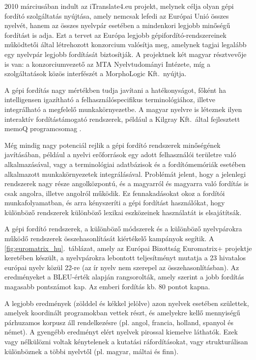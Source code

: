 \begin{multicols}{2}
  2010 márciusában indult az iTranslate4.eu \cite{it4eu} projekt, melynek célja olyan gépi fordító szolgáltatás nyújtása, amely nemcsak lefedi az Európai Unió összes nyelvét, hanem az összes nyelvpár esetében a mindenkori legjobb minőségű fordítást is adja. Ezt a tervet az Európa legjobb gépifordító-rendszereinek működtetői által létrehozott konzorcium valósítja meg, amelynek tagjai legalább egy nyelvpár legjobb fordítását biztosítják. A projektnek két magyar résztvevője is van: a konzorciumvezető az MTA Nyelvtudományi Intézete, míg a szolgáltatások közös interfészét a MorphoLogic Kft.\ nyújtja. 

  A gépi fordítás nagy mértékben tudja javítani a hatékonyságot, főként ha intelligensen igazítható a felhasználóspecifikus terminológiához, illetve integrálható a megfelelő munkakörnyezetbe. A ma\-gyar nyelvre is léteznek ilyen interaktív fordítástámogató rendszerek, például a Kilgray Kft.\ által fejlesztett memoQ prog\-ram\-cso\-mag \cite{memoq}. 

  Még mindig nagy potenciál rejlik a gépi fordító rendszerek minőségének ja\-ví\-tá\-sá\-ban, például a nyelvi erőforrások egy adott felhasználói területre való alkalmazásával, vagy a terminológiai adatbázisok és a fordítómemóriák esetében alkalmazott munkakörnyezetek integrálásával. Problémát jelent, hogy a jelenlegi rendszerek nagy része angolközpontú, és a magyarról és magyarra való fordítás is csak angolra, illetve angolról működik. Ez fennakadásokat okoz a fordítói munkafolyamatban, és arra kényszeríti a gépi fordítást használókat, hogy különböző rendszerek különböző lexikai eszközeinek használatát is elsajátítsák.

  A gépi fordító rendszerek, a különböző módszerek és a különböző nyelvpárokra működő rendszerek összehasonlítását ki\-ér\-té\-ke\-lő kampányok segítik. A \ref{fig:euromatrix_hu}.~táblázat, amely az Európai Bizottság Euromatrix+ projektje keretében készült, a nyelvpárokra lebontott teljesítményt mutatja a 23 hivatalos európai nyelv közül 22-re (az ír nyelv nem szerepel az összehasonlításban). Az eredményeket a BLEU-érték \cite{bleu1} alapján rangsorolták, amely szerint a jobb fordítás magasabb pontszámot kap. Az emberi fordítás kb. 80 pontot kapna.

  A legjobb eredmények (zölddel és kékkel jelölve) azon nyelvek esetében születtek, amelyek koordinált programokban vettek részt, és amelyekre kellő mennyiségű párhuzamos korpusz áll rendelkezésre (pl. angol, francia, holland, spanyol és német). A gyengébb eredményt elért nyelvek pi\-ros\-sal kiemelve láthatók. Ezek vagy nélkülözni voltak kénytelenek a kutatási ráfordításokat, vagy strukturálisan különböznek a többi nyelvtől (pl. magyar, máltai és finn).


\end{multicols}
